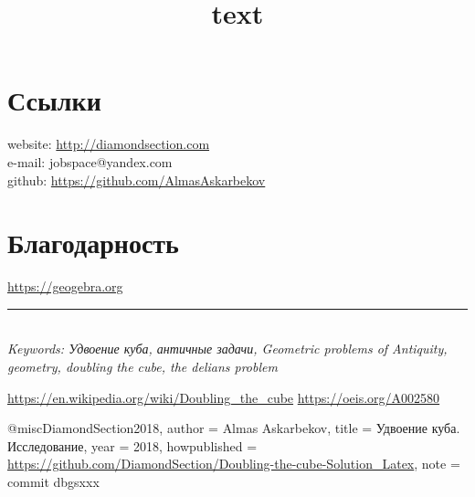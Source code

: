 \documentclass[12pt, letterpaper, oneside]{report}
\begin{document}
\begin{minipage}{0.8\textwidth}

\title{text}

	
\section{Ссылки}


website: \url{ http://diamondsection.com} \\
e-mail: jobspace@yandex.com \\
github: \url{https://github.com/AlmasAskarbekov}

\section{Благодарность}
\url{https://geogebra.org}
\\

\end{minipage}
\vspace{365pt}
\hrule
\ 
\\
\emph{Keywords: Удвоение куба, античные задачи, Geometric problems of Antiquity, geometry, doubling the cube, the delians problem}




\begin{thebibliography}{5}
\url{https://en.wikipedia.org/wiki/Doubling_the_cube}
\url{https://oeis.org/A002580}
\end{thebibliography}

\vspace{465pt}
@misc{DiamondSection2018,
	author = {Almas Askarbekov},
	title = {Удвоение куба. Исследование},
	year = {2018},
	howpublished = {\url{https://github.com/DiamondSection/Doubling-the-cube-Solution_Latex}},
	note = {commit dbgsxxx}
}
\end{document}
